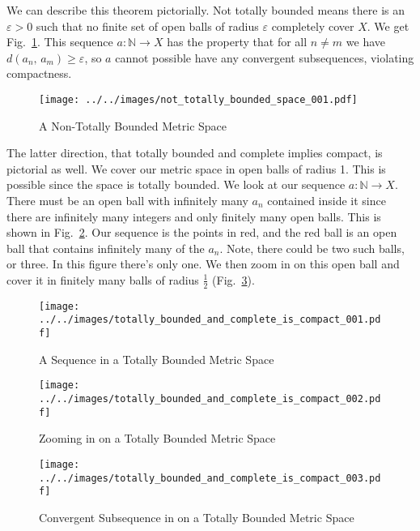 \documentclass{article}
\theoremstyle{plain}
\theoremstyle{normal}
\begin{document}
        We can describe this theorem pictorially. Not totally bounded means
        there is an $\varepsilon>0$ such that no finite set of open balls of
        radius $\varepsilon$ completely cover $X$. We get
        Fig.~\ref{fig:not_totally_bounded_space_001}. This sequence
        $a:\mathbb{N}\rightarrow{X}$ has the property that for all
        $n\ne{m}$ we have $d(a_{n},\,a_{m})\geq\varepsilon$, so $a$ cannot
        possible have any convergent subsequences, violating compactness.
        \begin{figure}
            \centering
            \texttt{[image: ../../images/not\_totally\_bounded\_space\_001.pdf]}
            \caption{A Non-Totally Bounded Metric Space}
            \label{fig:not_totally_bounded_space_001}
        \end{figure}
        The latter direction, that totally bounded and complete implies
        compact, is pictorial as well. We cover our metric space in open
        balls of radius 1. This is possible since the space is totally bounded.
        We look at our sequence $a:\mathbb{N}\rightarrow{X}$. There must be an
        open ball with infinitely many $a_{n}$ contained inside it since there
        are infinitely many integers and only finitely many open balls.
        This is shown in
        Fig.~\ref{fig:totally_bounded_and_complete_is_compact_001}. Our
        sequence is the points in red, and the red ball is an open ball that
        contains infinitely many of the $a_{n}$. Note, there could be two such
        balls, or three. In this figure there's only one. We then zoom in on
        this open ball and cover it in finitely many balls of radius
        $\frac{1}{2}$ (Fig.~\ref{fig:totally_bounded_and_complete_is_compact_002}).
        \begin{figure}
            \centering
            \texttt{[image: ../../images/totally\_bounded\_and\_complete\_is\_compact\_001.pdf]}
            \caption{A Sequence in a Totally Bounded Metric Space}
            \label{fig:totally_bounded_and_complete_is_compact_001}
        \end{figure}
        \begin{figure}
            \centering
            \texttt{[image: ../../images/totally\_bounded\_and\_complete\_is\_compact\_002.pdf]}
            \caption{Zooming in on a Totally Bounded Metric Space}
            \label{fig:totally_bounded_and_complete_is_compact_002}
        \end{figure}
        \begin{figure}
            \centering
            \texttt{[image: ../../images/totally\_bounded\_and\_complete\_is\_compact\_003.pdf]}
            \caption{Convergent Subsequence in on a Totally Bounded Metric Space}
            \label{fig:totally_bounded_and_complete_is_compact_003}
        \end{figure}
\end{document}
